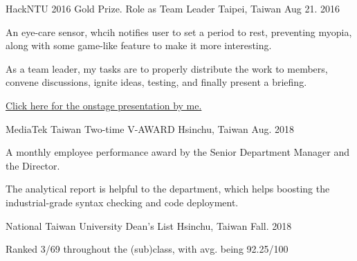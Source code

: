 

\begin{cventries}
\cventry
    {HackNTU 2016} %
    {Gold Prize. Role as Team Leader} %
    {Taipei, Taiwan} %
    {Aug 21. 2016} %
    {
      \begin{cvitems} %
        \item {An eye-care sensor, whcih notifies user to set a period to rest, preventing myopia, along with some game-like feature to make it more interesting.}
        \item {As a team leader, my tasks are to properly distribute the work to members, convene discussions, ignite ideas, testing, and finally present a briefing.}
        \item {\href{https://www.youtube.com/watch?v=LerD1-Vispg}{Click here for the onstage presentation by me.}}
      \end{cvitems}
    } 

\cventry
    {MediaTek Taiwan} %
    {Two-time V-AWARD} %
    {Hsinchu, Taiwan} %
    {Aug. 2018} %
    {
      \begin{cvitems} %
        \item {A monthly employee performance award by the Senior Department Manager and the Director.}
        \item {The analytical report is helpful to the department, which helps boosting the industrial-grade syntax checking and code deployment.}
      \end{cvitems}
    }

\cventry
    {National Taiwan University} %
    {Dean's List} %
    {Hsinchu, Taiwan} %
    {Fall. 2018} %
    {
      \begin{cvitems} %
        \item {Ranked 3/69 throughout the (sub)class, with avg. being 92.25/100}
      \end{cvitems}
    }


\end{cventries}
